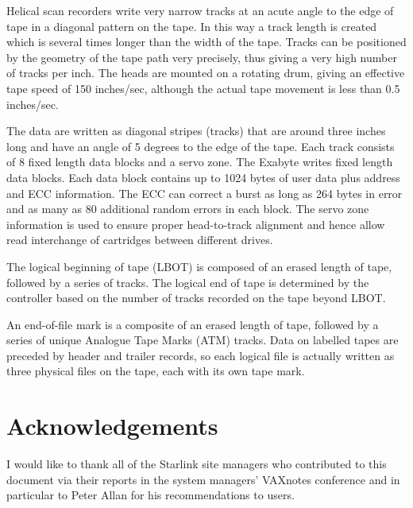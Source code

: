 Helical scan recorders write very narrow tracks at an acute angle to the edge
of tape in a diagonal pattern on the tape. In this way a track length is
created which is several times longer than the width of the tape.  Tracks can
be positioned by the geometry of the tape path  very precisely, thus
giving a very high number of tracks per inch.  The heads are mounted on a
rotating drum, giving an effective tape speed of 150 inches/sec, although the
actual tape movement is less than 0.5 inches/sec.

The data are written as diagonal stripes (tracks) that are around  three inches
long and have an angle of 5 degrees to the edge of the tape. Each track
consists of 8 fixed length data blocks and a servo zone. 
The Exabyte writes fixed length data blocks.
Each data block 
contains up to 1024 bytes of user data plus address and ECC information.
The ECC can correct a burst as long as 264 bytes in error and as many as 80
additional random errors in each block. The servo zone information is used
to ensure proper head-to-track alignment and hence allow read interchange of 
cartridges between different drives.

The logical beginning of tape (LBOT) is composed of an erased length of tape,
followed by a series of tracks. The logical end of tape is determined by the
controller based on the number of tracks recorded on the tape beyond LBOT.
    
An end-of-file mark is a composite of an erased length of tape, followed by a 
series of unique Analogue Tape Marks (ATM) tracks.
Data on labelled tapes are preceded by header and trailer
records, so each logical file is actually written as three physical files on
the tape, each with its own tape mark. 

\section{Acknowledgements}

I would like to thank all of the Starlink site managers who contributed
to this document via their reports in the system managers' VAXnotes
conference and in particular to Peter Allan for his recommendations
to users.


